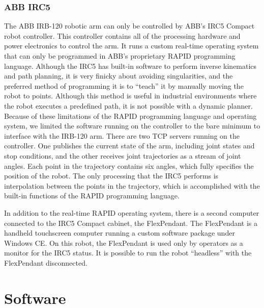 \documentclass{cwru}
\begin{document}
\subsubsection[ABB IRC5]{ABB IRC5}
The ABB IRB-120 robotic arm can only be controlled by ABB{\textquoteright}s IRC5 Compact robot controller. This controller contains all of the processing hardware and power electronics to control the arm. It runs a custom real-time operating system that can only be programmed in ABB{\textquoteright}s proprietary RAPID programming language. Although the IRC5 has built-in software to perform inverse kinematics and path planning, it is very finicky about avoiding singularities, and the preferred method of programming it is to {\textquotedblleft}teach{\textquotedblright} it by manually moving the robot to points. Although this method is useful in industrial environments where the robot executes a predefined path, it is not possible with a dynamic planner. Because of these limitations of the RAPID programming language and operating system, we limited the software running on the controller to the bare minimum to interface with the IRB-120 arm. There are two TCP servers running on the controller. One publishes the current state of the arm, including joint states and stop conditions, and the other receives joint trajectories as a stream of joint angles. Each point in the trajectory contains six angles, which fully specifies the position of the robot. The only processing that the IRC5 performs is interpolation between the points in the trajectory, which is accomplished with the built-in functions of the RAPID programming language.

In addition to the real-time RAPID operating system, there is a second computer connected to the IRC5 Compact cabinet, the FlexPendant. The FlexPendant is a handheld touchscreen computer running a custom software package under Windows CE. On this robot, the FlexPendant is used only by operators as a monitor for the IRC5 status. It is possible to run the robot {\textquotedblleft}headless{\textquotedblright} with the FlexPendant disconnected.

\section[Software]{Software}
\end{document}
